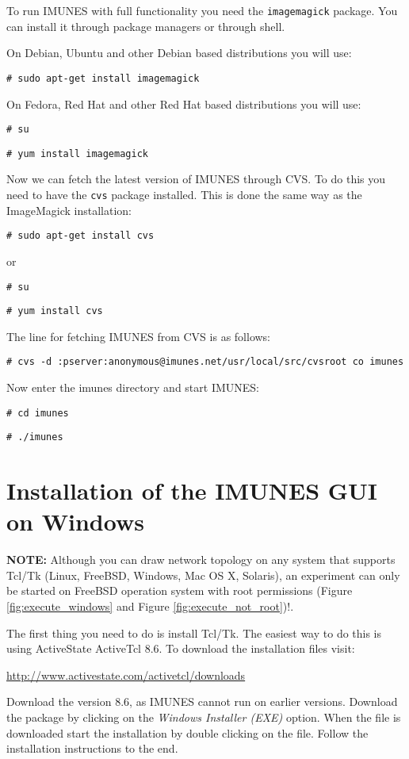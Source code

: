 To run IMUNES with full functionality you need the \texttt{imagemagick}
package. You can install it through package managers or through shell.

On Debian, Ubuntu and other Debian based distributions you will use:

\texttt{\# sudo apt-get install imagemagick}

On Fedora, Red Hat and other Red Hat based distributions you will use:

\texttt{\# su}

\texttt{\# yum install imagemagick}

Now we can fetch the latest version of IMUNES through CVS. To do this you need
to have the \texttt{cvs} package installed. This is done the same way as the
ImageMagick installation:

\texttt{\# sudo apt-get install cvs}

or

\texttt{\# su}

\texttt{\# yum install cvs}

The line for fetching IMUNES from CVS is as follows:

\texttt{\# cvs -d :pserver:anonymous@imunes.net/usr/local/src/cvsroot co
imunes}

Now enter the imunes directory and start IMUNES:

\texttt{\# cd imunes}

\texttt{\# ./imunes}

\section{Installation of the IMUNES GUI on Windows}
\textbf{NOTE:} Although you can draw network topology on any system that
supports Tcl/Tk (Linux, FreeBSD, Windows, Mac OS X, Solaris), an  experiment
can only be started on FreeBSD operation system with root permissions (Figure
\ref{fig:execute_windows} and Figure  \ref{fig:execute_not_root})!.

The first thing you need to do is install Tcl/Tk. The easiest way to do this is
using ActiveState ActiveTcl 8.6. To download the installation files visit:

\begin{center}
\url{http://www.activestate.com/activetcl/downloads}
\end{center}
 
Download the version 8.6, as IMUNES cannot run on earlier versions. Download
the package by clicking on the \emph{Windows Installer (EXE)} option. When the
file is downloaded start the installation by double clicking on the file.
Follow the installation instructions to the end.

